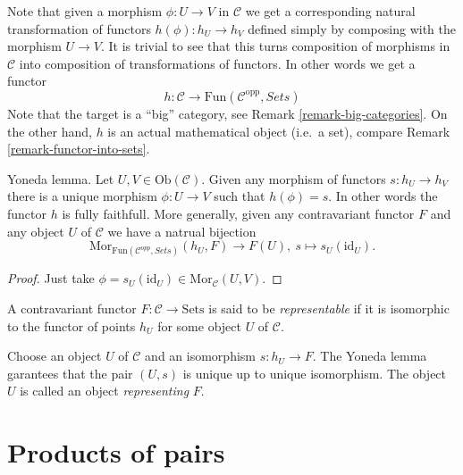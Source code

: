 \noindent
Note that given a morphism $\phi : U \to V$ in $\mathcal{C}$ we get a
corresponding natural transformation of functors
$h(\phi) : h_U \to h_V$ defined simply by composing with the morphism
$U \to V$. It is trivial to see that this turns
composition of morphisms in $\mathcal{C}$ into composition of
transformations of functors. In other words we get a functor
$$
h :
\mathcal{C}
\longrightarrow
\text{Fun}(\mathcal{C}^{\text{opp}}, \textit{Sets})
$$
Note that the target is a ``big'' category, see
Remark \ref{remark-big-categories}. On the other hand,
$h$ is an actual mathematical object (i.e.\ a set), compare Remark
\ref{remark-functor-into-sets}.

\begin{lemma}
\label{lemma-yoneda}
Yoneda lemma.
Let $U,V \in \text{Ob}(\mathcal{C})$.
Given any morphism of functors $s : h_U \to h_V$
there is a unique morphism $\phi : U \to V$
such that $h(\phi) = s$. In other words the
functor $h$ is fully faithfull. More generally,
given any contravariant functor $F$ and any object
$U$ of $\mathcal{C}$ we have a natrual bijection
$$
\text{Mor}_{\text{Fun}(\mathcal{C}^{opp}, \textit{Sets})}(h_U, F)
\longrightarrow
F(U),\ 
s \longmapsto s_U(\text{id}_U).
$$
\end{lemma}

\begin{proof}
Just take $\phi = s_U(\text{id}_U) \in \text{Mor}_{\mathcal{C}}(U,V)$.
\end{proof}

\begin{definition}
\label{definition-representable-functor}
A contravariant functor $F : \mathcal{C}\to \text{Sets}$ is said
to be {\it representable} if it is isomorphic to the functor of
points $h_U$ for some object $U$ of $\mathcal{C}$.
\end{definition}

\noindent
Choose an object $U$ of $\mathcal{C}$ and an isomorphism $s : h_U \to F$.
The Yoneda lemma garantees that the pair $(U, s)$ 
is unique up to unique isomorphism. The object
$U$ is called an object {\it representing} $F$.






\section{Products of pairs}
\label{section-products-pairs}

